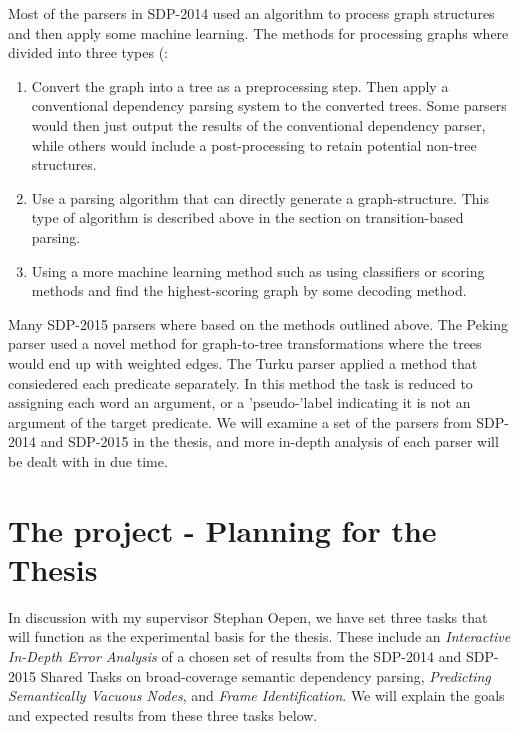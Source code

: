 \documentclass[10pt]{article}
\begin{document}
Most of the parsers in SDP-2014 used an algorithm to process graph structures and then apply some machine learning. The methods for processing graphs where divided into three types (\cite{semeval2015}:

\begin{enumerate}
\item Convert the graph into a tree as a preprocessing step. Then apply a conventional dependency parsing system to the converted trees. Some parsers would then just output the results of the conventional dependency parser, while others would include a post-processing to retain potential non-tree structures. 
\item Use a parsing algorithm that can directly generate a graph-structure. This type of algorithm is described above in the section on transition-based parsing. 
\item Using a more machine learning method such as using classifiers or scoring methods and find the highest-scoring graph by some decoding method. 
\end{enumerate}

Many SDP-2015 parsers where based on the methods outlined above. The Peking parser used a novel method for graph-to-tree transformations where the trees would end up with weighted edges. The Turku parser applied a method that consiedered each predicate separately. In this method the task is reduced to assigning each word an argument, or a 'pseudo-'label indicating it is not an argument of the target predicate. We will examine a set of the parsers from SDP-2014 and SDP-2015 in the thesis, and more in-depth analysis of each parser will be dealt with in due time.



\section{The project - Planning for the Thesis}

In discussion with my supervisor Stephan Oepen, we have set three tasks that will function as the experimental basis for the thesis. These include an \textit{Interactive In-Depth Error Analysis} of a chosen set of results from the SDP-2014 and SDP-2015 Shared Tasks on broad-coverage semantic dependency parsing, \textit{Predicting Semantically Vacuous Nodes}, and \textit{Frame Identification}. We will explain the goals and expected results from these three tasks below.
\end{document}
